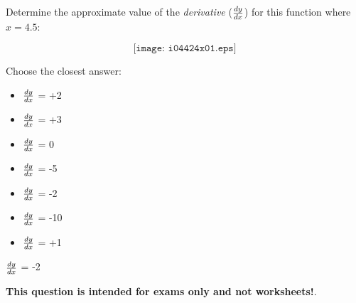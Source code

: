 

Determine the approximate value of the {\it derivative} ($dy \over dx$) for this function where $x=4.5$:

$$\texttt{[image: i04424x01.eps]}$$

Choose the closest answer:

\begin{itemize}
\item{} $dy \over dx$ = +2
\vskip 10pt 
\item{} $dy \over dx$ = +3
\vskip 10pt 
\item{} $dy \over dx$ = 0
\vskip 10pt 
\item{} $dy \over dx$ = -5
\vskip 10pt 
\item{} $dy \over dx$ = -2 
\vskip 10pt 
\item{} $dy \over dx$ = -10
\vskip 10pt 
\item{} $dy \over dx$ = +1

\end{itemize}







$dy \over dx$ = -2







{\bf This question is intended for exams only and not worksheets!}.



